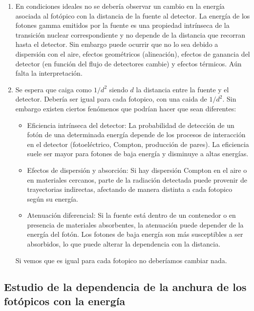 \documentclass[11pt]{article}
\begin{document}
\begin{enumerate}[label=\alph*)]
    \item En condiciones ideales no se debería observar un cambio en la energía asociada al fotópico con la distancia de la fuente al detector. La energía de los fotones gamma emitidos por la fuente es una propiedad intrínseca de la transición nuclear correspondiente y no depende de la distancia que recorran hasta el detector. Sin embargo puede ocurrir que no lo sea debido a dispersión con el aire, efectos geométricos (alineación), efectos de ganancia del detector (en función del flujo de detectores cambie) y efectos térmicos. \textcolor{BrickRed}{Aún falta la interpretación.}
    \item Se espera que caiga como $1/d^2$ siendo $d$ la distancia entre la fuente y el detector. Debería ser igual para cada fotopico, con una caida de $1/d^2$. Sin embargo existen ciertos fenómenos que podrían hacer que sean diferentes: 
    \begin{itemize}
        \item Eficiencia intrínseca del detector: La probabilidad de detección de un fotón de una determinada energía depende de los procesos de interacción en el detector (fotoeléctrico, Compton, producción de pares). La eficiencia suele ser mayor para fotones de baja energía y disminuye a altas energías.
        \item Efectos de dispersión y absorción: Si hay dispersión Compton en el aire o en materiales cercanos, parte de la radiación detectada puede provenir de trayectorias indirectas, afectando de manera distinta a cada fotopico según su energía. 
        \item Atenuación diferencial: Si la fuente está dentro de un contenedor o en presencia de materiales absorbentes, la atenuación puede depender de la energía del fotón. Los fotones de baja energía son más susceptibles a ser absorbidos, lo que puede alterar la dependencia con la distancia.
    \end{itemize}
    \textcolor{BrickRed}{Si vemos que es igual para cada fotopico no deberíamos cambiar nada.}
\end{enumerate}

\subsection{Estudio de la dependencia de la anchura de los fotópicos con la energía}
\end{document}
